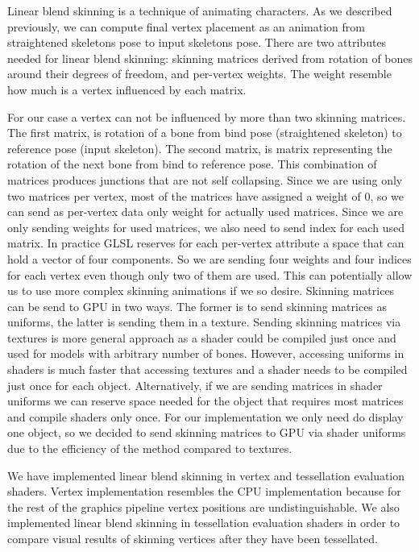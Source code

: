 Linear blend skinning is a technique of animating characters.
As we described previously, we can compute final vertex placement as an animation from straightened skeletons pose to input skeletons pose.
There are two attributes needed for linear blend skinning: skinning matrices derived from rotation of bones around their degrees of freedom, and per-vertex weights.
The weight resemble how much is a vertex influenced by each matrix.

For our case a vertex can not be influenced by more than two skinning matrices.
The first matrix, is rotation of a bone from bind pose (straightened skeleton) to reference pose (input skeleton).
The second matrix, is matrix representing the rotation of the next bone from bind to reference pose.
This combination of matrices produces junctions that are not self collapsing.
Since we are using only two matrices per vertex, most of the matrices have assigned a weight of 0, so we can send as per-vertex data only weight for actually used matrices.
Since we are only sending weights for used matrices, we also need to send index for each used matrix.
In practice GLSL reserves for each per-vertex attribute a space that can hold a vector of four components.
So we are sending four weights and four indices for each vertex even though only two of them are used.
This can potentially allow us to use more complex skinning animations if we so desire.
Skinning matrices can be send to GPU in two ways.
The former is to send skinning matrices as uniforms, the latter is sending them in a texture.
Sending skinning matrices via textures is more general approach as a shader could be compiled just once and used for models with arbitrary number of bones.
However, accessing uniforms in shaders is much faster that accessing textures and a shader needs to be compiled just once for each object.
Alternatively, if we are sending matrices in shader uniforms we can reserve space needed for the object that requires most matrices and compile shaders only once.
For our implementation we only need do display one object, so we decided to send skinning matrices to GPU via shader uniforms due to the efficiency of the method compared to textures.

We have implemented linear blend skinning in vertex and tessellation evaluation shaders.
Vertex implementation resembles the CPU implementation because for the rest of the graphics pipeline vertex positions are undistinguishable.
We also implemented linear blend skinning in tessellation evaluation shaders in order to compare visual results of skinning vertices after they have been tessellated.

